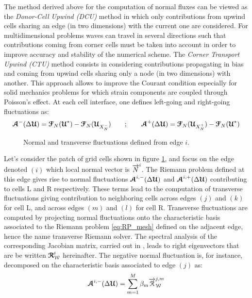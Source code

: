 The method derived above for the computation of normal fluxes can be viewed as the \textit{Donor-Cell Upwind (DCU)} method \cite{Leveque} in which only contributions from upwind cells sharing an edge (in two dimensions) with the current one are considered. For multidimensional problems waves can travel in several directions such that contributions coming from corner cells must be taken into account in order to improve accuracy and stability of the numerical scheme. The \textit{Corner Transport Upwind (CTU)} method \cite{Colella_CTU} consists in considering contributions propagating in bias and coming from upwind cells sharing only a node (in two dimensions) with another. This approach allows to improve the Courant condition especially for solid mechanics problems for which strain components are coupled through Poisson's effect. At each cell interface, one defines left-going and right-going fluctuations as:
\begin{equation}
  {\boldsymbol{\mathcal{A}}}^-(\Delta {\boldsymbol{\mathcal{U}}}) = {\boldsymbol{\mathcal{F}}}_N({\boldsymbol{\mathcal{U}}}^*) - {\boldsymbol{\mathcal{F}}}_N({\boldsymbol{\mathcal{U}}}_{X_N^-}) \qquad ;  \qquad {\boldsymbol{\mathcal{A}}}^+(\Delta {\boldsymbol{\mathcal{U}}}) = {\boldsymbol{\mathcal{F}}}_N({\boldsymbol{\mathcal{U}}}_{X_N^+})-{\boldsymbol{\mathcal{F}}}_N({\boldsymbol{\mathcal{U}}}^*) 
\end{equation}
\begin{figure}[h!]
  \centering
  
  \caption{Normal and transverse fluctuations defined from edge $i$.}
  \label{fig:CTU}
\end{figure}
Let's consider the patch of grid cells shown in figure \ref{fig:CTU}, and focus on the edge denoted $(i)$ which local normal vector is ${\overrightarrow{N}}^i$. The Riemann problem defined at this edge gives rise to normal fluctuations ${\boldsymbol{\mathcal{A}}}^{i,-}(\Delta {\boldsymbol{\mathcal{U}}})$ and ${\boldsymbol{\mathcal{A}}}^{i,+}(\Delta {\boldsymbol{\mathcal{U}}})$ contributing to cells L and R respectively. These terms lead to the computation of transverse fluctuations giving contribution to neighboring cells across edges $(j)$ and $(k)$ for cell L, and across edges $(m)$ and $(l)$ for cell R. Transverse fluctuations are computed by projecting normal fluctuations onto the characteristic basis associated to the Riemann problem \eqref{eq:RP_mesh} defined on the adjacent edge, hence the name transverse Riemann solver. The spectral analysis of the corresponding Jacobian matrix, carried out in \cite{Kluth}, leads to right eigenvectors that are be written ${\boldsymbol{\mathcal{R}}}_{\mathcal{W}}^i$ hereinafter. The negative normal fluctuation is, for instance, decomposed on the characteristic basis associated to edge $(j)$ as:
\begin{equation}
{\boldsymbol{\mathcal{A}}}^{i,-}(\Delta {\boldsymbol{\mathcal{U}}}) = \sum_{m=1}^{M} \beta_m {\overrightarrow{\mathcal{R}}}^{j,m}_{\mathcal{W}}
\end{equation}
